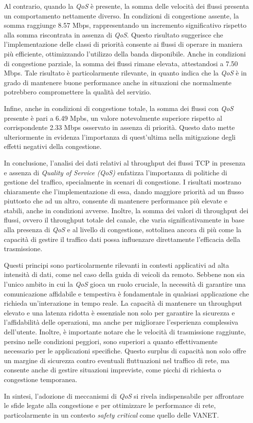 Al contrario, quando la \textit{QoS} è presente, la somma delle velocità dei flussi presenta un comportamento nettamente diverso. In condizioni di congestione assente, la somma raggiunge 8.57 Mbps, rappresentando un incremento significativo rispetto alla somma riscontrata in assenza di \textit{QoS}. Questo risultato suggerisce che l'implementazione delle classi di priorità consente ai flussi di operare in maniera più efficiente, ottimizzando l'utilizzo della banda disponibile. Anche in condizioni di congestione parziale, la somma dei flussi rimane elevata, attestandosi a 7.50 Mbps. Tale risultato è particolarmente rilevante, in quanto indica che la \textit{QoS} è in grado di mantenere buone performance anche in situazioni che normalmente potrebbero compromettere la qualità del servizio.

Infine, anche in condizioni di congestione totale, la somma dei flussi con \textit{QoS} presente è pari a 6.49 Mpbs, un valore notevolmente superiore rispetto al corrispondente 2.33 Mbps osservato in assenza di priorità. Questo dato mette ulteriormente in evidenza l'importanza di quest'ultima nella mitigazione degli effetti negativi della congestione.

In conclusione, l'analisi dei dati relativi al throughput dei flussi TCP in presenza e assenza di \textit{Quality of Service (QoS)} enfatizza l'importanza di politiche di gestione del traffico, specialmente in scenari di congestione. I risultati mostrano chiaramente che l'implementazione di essa, dando maggiore priorità ad un flusso piuttosto che ad un altro, consente di mantenere performance più elevate e stabili, anche in condizioni avverse. Inoltre, la somma dei valori di throughput dei flussi, ovvero il throughput totale del canale, che varia significativamente in base alla presenza di \textit{QoS} e al livello di congestione, sottolinea ancora di più come la capacità di gestire il traffico dati possa influenzare direttamente l'efficacia della trasmissione.

Questi principi sono particolarmente rilevanti in contesti applicativi ad alta intensità di dati, come nel caso della guida di veicoli da remoto. Sebbene non sia l'unico ambito in cui la \textit{QoS} gioca un ruolo cruciale, la necessità di garantire una comunicazione affidabile e tempestiva è fondamentale in qualsiasi applicazione che richieda un'interazione in tempo reale. La capacità di mantenere un throughput elevato e una latenza ridotta è essenziale non solo per garantire la sicurezza e l'affidabilità delle operazioni, ma anche per migliorare l'esperienza complessiva dell'utente. Inoltre, è importante notare che le velocità di trasmissione raggiunte, persino nelle condizioni peggiori, sono superiori a quanto effettivamente necessario per le applicazioni specifiche. Questo surplus di capacità non solo offre un margine di sicurezza contro eventuali fluttuazioni nel traffico di rete, ma consente anche di gestire situazioni impreviste, come picchi di richiesta o congestione temporanea.

In sintesi, l'adozione di meccanismi di \textit{QoS} si rivela indispensabile per affrontare le sfide legate alla congestione e per ottimizzare le performance di rete, particolarmente in un contesto \textit{safety critical} come quello delle VANET.